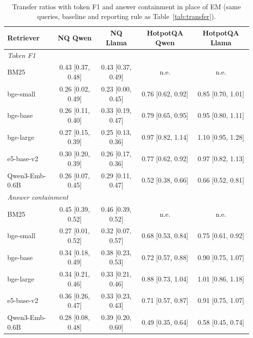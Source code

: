 \begin{table}[t]
\centering
\small
\caption{Transfer ratios with token F1 and answer containment in place of EM (same queries, baseline and reporting rule as Table~\ref{tab:transfer}).}
\label{tab:transferalt}
\begin{tabular}{lcccc}
\toprule
Retriever & NQ Qwen & NQ Llama & HotpotQA Qwen & HotpotQA Llama \\
\midrule
\multicolumn{5}{l}{\emph{Token F1}} \\
BM25 & 0.43 [0.37, 0.48] & 0.43 [0.37, 0.49] & n.e. & n.e. \\
bge-small & 0.26 [0.02, 0.49] & 0.23 [0.00, 0.45] & 0.76 [0.62, 0.92] & 0.85 [0.70, 1.01] \\
bge-base & 0.26 [0.11, 0.40] & 0.33 [0.19, 0.47] & 0.79 [0.65, 0.95] & 0.95 [0.80, 1.11] \\
bge-large & 0.27 [0.15, 0.39] & 0.25 [0.13, 0.36] & 0.97 [0.82, 1.14] & 1.10 [0.95, 1.28] \\
e5-base-v2 & 0.30 [0.20, 0.39] & 0.26 [0.17, 0.36] & 0.77 [0.62, 0.92] & 0.97 [0.82, 1.13] \\
Qwen3-Emb-0.6B & 0.26 [0.07, 0.45] & 0.29 [0.11, 0.47] & 0.52 [0.38, 0.66] & 0.66 [0.52, 0.81] \\
\multicolumn{5}{l}{\emph{Answer containment}} \\
BM25 & 0.45 [0.39, 0.52] & 0.46 [0.39, 0.52] & n.e. & n.e. \\
bge-small & 0.27 [0.01, 0.52] & 0.32 [0.07, 0.57] & 0.68 [0.53, 0.84] & 0.75 [0.61, 0.92] \\
bge-base & 0.34 [0.18, 0.49] & 0.38 [0.23, 0.53] & 0.72 [0.57, 0.88] & 0.90 [0.75, 1.07] \\
bge-large & 0.34 [0.21, 0.46] & 0.33 [0.21, 0.46] & 0.88 [0.73, 1.04] & 1.01 [0.86, 1.18] \\
e5-base-v2 & 0.36 [0.26, 0.47] & 0.33 [0.23, 0.43] & 0.71 [0.57, 0.87] & 0.91 [0.75, 1.07] \\
Qwen3-Emb-0.6B & 0.28 [0.08, 0.48] & 0.39 [0.20, 0.60] & 0.49 [0.35, 0.64] & 0.58 [0.45, 0.74] \\
\bottomrule
\end{tabular}
\end{table}
